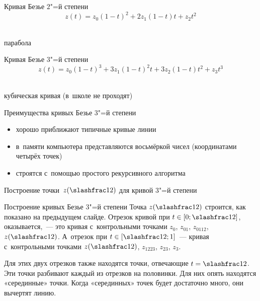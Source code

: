\begin{frame}{Кривая Безье $2$"=й степени}
	\[
	z(t)=z_0(1-t)^2+2z_1(1-t)t+z_2t^2
	\]
\begin{center}
\\[4ex]
парабола
\end{center}
\end{frame}

\begin{frame}{Кривая Безье $3$"=й степени}
	\[
	z(t)=z_0(1-t)^3+3z_1(1-t)^2t+3z_2(1-t)t^2+z_3t^3
	\]
\begin{center}
\\[4ex]
кубическая кривая (в~школе не проходят)
\end{center}
\end{frame}

\begin{frame}{Преимущества кривых Безье $3$"=й степени}
\begin{itemize}
\item
хорошо приближают типичные кривые линии
\item
в~памяти компьютера представляются восьмёркой чисел (координатами четырёх
точек)
\item
строятся с~помощью простого рекурсивного алгоритма
\end{itemize}
\end{frame}

\begin{frame}{Построение точки~$z(\slashfrac12)$ для кривой $3$"=й
степени}
\begin{center}
\end{center}
\end{frame}

\begin{frame}{Построение кривых Безье $3$"=й степени}
Точка $z(\slashfrac12)$ строится, как показано на предыдущем слайде. Отрезок
кривой при $t\in[0;\slashfrac12]$, оказывается,~— это кривая с~контрольными
точками $z_0$, $z_{01}$, $z_{0112}$, $z(\slashfrac12)$. А~отрезок при
$t\in[\slashfrac12;1]$~— кривая с~контрольными точками $z(\slashfrac12)$,
$z_{1223}$, $z_{23}$, $z_3$.

Для этих двух отрезков также находятся точки, отвечающие $t=\slashfrac12$. Эти
точки разбивают каждый из отрезков на половинки. Для них опять находятся
«серединные» точки. Когда «серединных» точек будет достаточно много, они
вычертят линию.
\end{frame}

